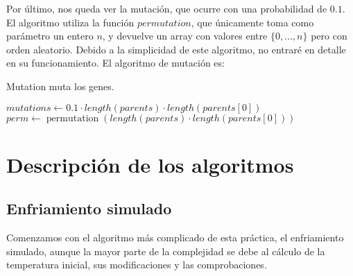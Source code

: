 \documentclass[11pt,a4paper]{article}
\begin{document}
Por último, nos queda ver la mutación, que ocurre con una probabilidad de $0.1$. El algoritmo utiliza la función $permutation$, que únicamente toma como parámetro un entero $n$, y devuelve un array con valores entre $\{0, \dots, n\}$ pero con orden aleatorio. Debido a la simplicidad de este algoritmo, no entraré en detalle en su funcionamiento. El algoritmo de mutación es: \\
\begin{algorithm}[H]
	\caption{{\sc Mutation} muta los genes.}
	
	$mutations \gets 0.1 \cdot length(parents) \cdot length(parents[0])$ \;
	$perm \gets \operatorname{permutation}(length(parents) \cdot length(parents[0]))$ \;
	
	 \;
\end{algorithm}

\newpage
\section{Descripción de los algoritmos}

\subsection{Enfriamiento simulado}

Comenzamos con el algoritmo más complicado de esta práctica, el enfriamiento simulado, aunque la mayor parte de la complejidad se debe al cálculo de la temperatura inicial, sus modificaciones y las comprobaciones.
\end{document}
